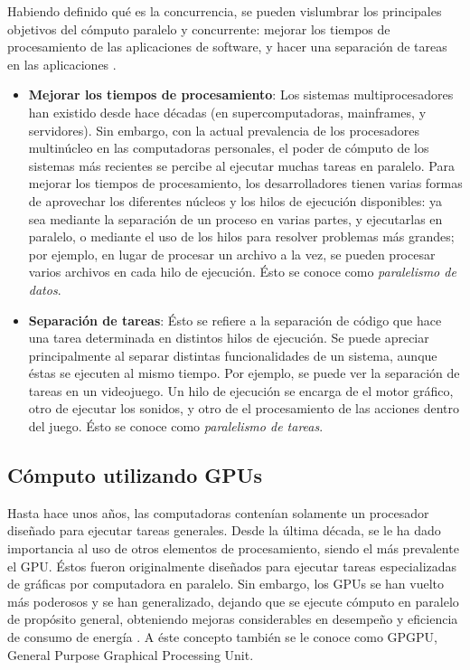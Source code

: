 Habiendo definido qué es la concurrencia, se pueden vislumbrar los principales objetivos del cómputo paralelo y concurrente: mejorar los tiempos de procesamiento de las aplicaciones de software, y hacer una separación de tareas en las aplicaciones \citep{williams2012c}.

\begin{itemize}
	\item \textbf{Mejorar los tiempos de procesamiento}: Los sistemas multiprocesadores han existido desde hace décadas (en supercomputadoras, mainframes, y servidores). Sin embargo, con la actual prevalencia de los procesadores multinúcleo en las computadoras personales, el poder de cómputo de los sistemas más recientes se percibe al ejecutar muchas tareas en paralelo. Para mejorar los tiempos de procesamiento, los desarrolladores tienen varias formas de aprovechar los diferentes núcleos y los hilos de ejecución disponibles: ya sea mediante la separación de un proceso en varias partes, y ejecutarlas en paralelo, o mediante el uso de los hilos para resolver problemas más grandes; por ejemplo, en lugar de procesar un archivo a la vez, se pueden procesar varios archivos en cada hilo de ejecución. Ésto se conoce como \textit{paralelismo de datos}.
	\item \textbf{Separación de tareas}: Ésto se refiere a la separación de código que hace una tarea determinada en distintos hilos de ejecución. Se puede apreciar principalmente al separar distintas funcionalidades de un sistema, aunque éstas se ejecuten al mismo tiempo. Por ejemplo, se puede ver la separación de tareas en un videojuego. Un hilo de ejecución se encarga de el motor gráfico, otro de ejecutar los sonidos, y otro de el procesamiento de las acciones dentro del juego. Ésto se conoce como \textit{paralelismo de tareas}.
\end{itemize}

\subsection{Cómputo utilizando GPUs}

Hasta hace unos años, las computadoras contenían solamente un procesador diseñado para ejecutar tareas generales. Desde la última década, se le ha dado importancia al uso de otros elementos de procesamiento, siendo el más prevalente el GPU. Éstos fueron originalmente diseñados para ejecutar tareas especializadas de gráficas por computadora en paralelo. Sin embargo, los GPUs se han vuelto más poderosos y se han generalizado, dejando que se ejecute cómputo en paralelo de propósito general, obteniendo mejoras considerables en desempeño y eficiencia de consumo de energía \citep{cuda2014cheng}. A éste concepto también se le conoce como GPGPU, General Purpose Graphical Processing Unit.

